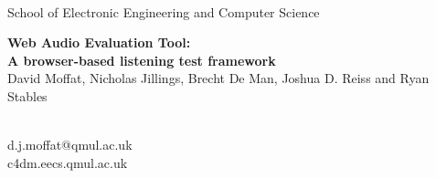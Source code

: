\begin{center}
\colorbox{qmuldarkblue}
{
 \color{white}

 \parbox{1.0\textwidth}
 {
  \parbox{0.2\textwidth}
  {
   \begin{center}
   \\[1ex]
   \textrm
   {
    \footnotesize
    {\fontsize{1cm}{1.2cm}\selectfont
    School of Electronic Engineering and Computer Science
    }
   }
   \end{center}
  }
  \parbox{0.58\textwidth}
  {
   \vspace{1cm}
   \begin{center}
    {\veryHuge \bf Web Audio Evaluation Tool:\\[0.5ex]
     A browser-based listening test framework}\\[1ex]
    {\Large David Moffat, Nicholas Jillings, Brecht De Man, Joshua D. Reiss and Ryan Stables}
   \end{center}
   \vspace{1cm}
  }
  \parbox{0.2\textwidth}
  {
   \begin{center}
   \\[1ex]
   \textrm
   {
     {\fontsize{1cm}{1.2cm}\selectfont
   d.j.moffat@qmul.ac.uk\\
    c4dm.eecs.qmul.ac.uk\\
    }
   }
   \end{center}
  }
 }
}
\end{center}
